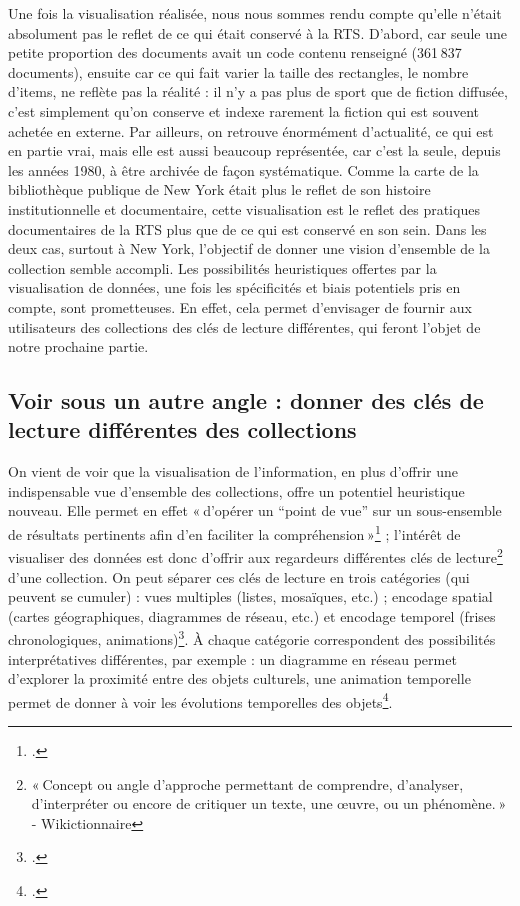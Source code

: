 Une fois la visualisation réalisée, nous nous sommes rendu compte qu’elle n’était absolument pas le reflet de ce qui était conservé à la RTS. D’abord, car seule une petite proportion des documents avait un code contenu renseigné (361 837 documents), ensuite car ce qui fait varier la taille des rectangles, le nombre d’items, ne reflète pas la réalité : il n’y a pas plus de sport que de fiction diffusée, c’est simplement qu’on conserve et indexe rarement la fiction qui est souvent achetée en externe. Par ailleurs, on retrouve énormément d’actualité, ce qui est en partie vrai, mais elle est aussi beaucoup représentée, car c’est la seule, depuis les années 1980, à être archivée de façon systématique. Comme la carte de la bibliothèque publique de New York était plus le reflet de son histoire institutionnelle et documentaire, cette visualisation est le reflet des pratiques documentaires de la RTS plus que de ce qui est conservé en son sein. Dans les deux cas, surtout à New York, l'objectif de donner une vision d'ensemble de la collection semble accompli. Les possibilités heuristiques offertes par la visualisation de données, une fois les spécificités et biais potentiels pris en compte, sont prometteuses. En effet, cela permet d'envisager de fournir aux utilisateurs des collections des clés de lecture différentes, qui feront l'objet de notre prochaine partie.

\subsection{Voir sous un autre angle : donner des clés de lecture différentes des collections}

On vient de voir que la visualisation de l’information, en plus d’offrir une indispensable vue d’ensemble des collections, offre un potentiel heuristique nouveau. Elle permet en effet « d’opérer un “point de vue” sur un sous-ensemble de résultats pertinents afin d’en faciliter la compréhension »\footcite[§ 3]{hachour_fouille_2015} ; l’intérêt de visualiser des données est donc d’offrir aux regardeurs différentes clés de lecture\footnote{ « Concept ou angle d’approche permettant de comprendre, d’analyser, d’interpréter ou encore de critiquer un texte, une œuvre, ou un phénomène. » - Wikictionnaire } d’une collection. On peut séparer ces clés de lecture en trois catégories (qui peuvent se cumuler) : vues multiples (listes, mosaïques, etc.) ; encodage spatial (cartes géographiques, diagrammes de réseau, etc.) et encodage temporel (frises chronologiques, animations)\footcite[p. 76]{windhager_review_nodate}. À chaque catégorie correspondent des possibilités interprétatives différentes, par exemple : un diagramme en réseau permet d’explorer la proximité entre des objets culturels, une animation temporelle permet de donner à voir les évolutions temporelles des objets\footcite[p. 77]{windhager_review_nodate}.

